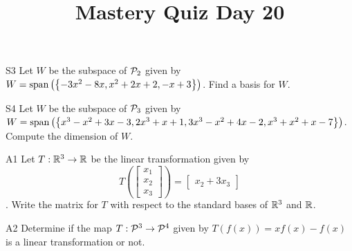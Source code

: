 \documentclass{sbgLAquiz}
\title{Mastery Quiz Day 20 }
\begin{document}
\begin{problem}{S3}
Let $W$ be the subspace of $\P_2$ given by $W = {\rm span} \left( \left\{  -3x^2-8x, x^2+2x+2, -x+3\right\} \right)$.   Find a basis for $W$.
\end{problem}

\begin{problem}{S4}
Let $W$ be the subspace of $\P_3$ given by $W={\rm span}\left( \left\{ x^3-x^2+3x-3, 2x^3+x+1, 3x^3-x^2+4x-2, x^3+x^2+x-7\right\}\right)$.  Compute the dimension of $W$.
\end{problem}
\newpage

\begin{problem}{A1}
Let $T: \IR^3 \rightarrow \IR$ be the linear transformation given by $$T\left(\begin{bmatrix} x_1 \\ x_2 \\ x_3  \end{bmatrix} \right) = \begin{bmatrix} x_2+3x_3 \end{bmatrix}$$. Write the matrix for $T$ with respect to the standard bases of $\IR^3$ and $\IR$.
\end{problem}

\begin{problem}{A2}
Determine if the map $T: \P^3 \rightarrow \P^4$ given by $T(f(x))=xf(x)-f(x)$ is a linear transformation or not.
\end{problem}
\end{document}
